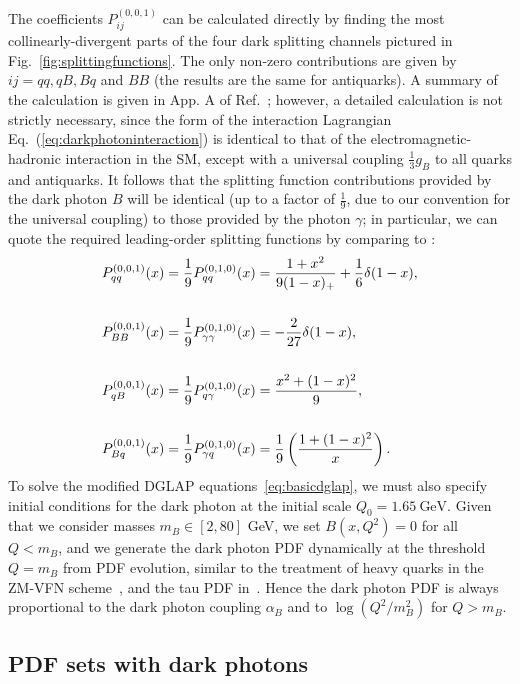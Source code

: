 \documentclass[withindex,glossary]{cam-thesis}
\begin{document}
%
The coefficients $P_{ij}^{(0,0,1)}$ can be calculated directly by
finding the most collinearly-divergent parts of the four dark
splitting channels pictured in Fig.~\ref{fig:splittingfunctions}. The only non-zero contributions are given by $ij=qq, qB, Bq$ and $BB$ (the results are the same for antiquarks).
A summary of the calculation is given in App. A of Ref.~\cite{McCullough:2022hzr}; 
however, a detailed calculation is not strictly necessary, since the form
of the interaction Lagrangian Eq.~(\ref{eq:darkphotoninteraction}) is identical
to that of the electromagnetic-hadronic interaction in the SM,
except with a universal coupling $\frac{1}{3}g_B$ to all quarks and antiquarks.
It follows that the splitting function contributions provided by the
dark photon $B$ will be identical (up to a factor of $\frac{1}{9}$, due to
our convention for the universal coupling) to those provided by the
photon $\gamma$; in particular, we can quote the required leading-order
splitting functions by comparing to \cite{Bertone:2015lqa}:
\begin{align}
\label{eq:splittingfunctions}
P_{qq}^{(0,0,1)}(x) &= \frac{1}{9}P_{qq}^{(0,1,0)}(x) = \frac{1+x^2}{9(1-x)_+} + \frac{1}{6} \delta(1-x), \notag\\\notag\\
 P_{BB}^{(0,0,1)}(x) &= \frac{1}{9} P_{\gamma\gamma}^{(0,1,0)}(x)= -\frac{2}{27}\delta(1-x), \notag\\ \\
P_{qB}^{(0,0,1)}(x) &= \frac{1}{9} P_{q\gamma}^{(0,1,0)}(x) = \frac{x^2 + (1-x)^2}{9},\notag\\\notag\\
 P_{Bq}^{(0,0,1)}(x) &= \frac{1}{9} P_{\gamma q}^{(0,1,0)}(x) = \frac{1}{9} \left( \frac{1 + (1-x)^2}{x} \right). \notag
\end{align}
To solve the modified DGLAP equations~\eqref{eq:basicdglap}, we must
also specify initial conditions for the dark photon at the initial scale $Q_0 = 1.65\ \text{GeV}$. 
Given that we consider masses $m_B \in [2,80]$ GeV, we set $B(x,Q^2)
= 0$ for all $Q < m_B$, and we generate the dark photon PDF dynamically
at the threshold $Q = m_B$ from PDF evolution, similar to the
treatment of heavy quarks in the ZM-VFN scheme~\cite{Maltoni:2012pa,Bertone:2017djs}, and the tau
PDF in~\cite{Bertone:2015lqa}. Hence the dark photon PDF is always
proportional to the dark photon coupling $\alpha_B$ and to
$\log(Q^2/m_B^2)$ for $Q>m_B$. 

\subsection{PDF sets with dark photons}
\end{document}
